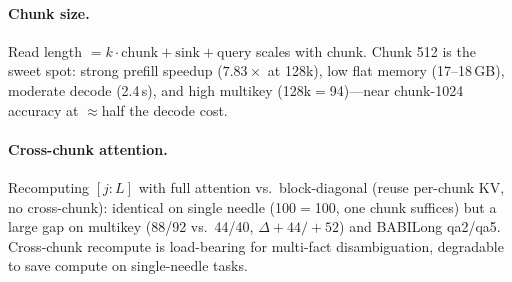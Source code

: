 \paragraph{Chunk size.} Read length $=k\cdot\text{chunk}+\text{sink}+\text{query}$
scales with chunk. Chunk 512 is the sweet spot: strong prefill speedup
($7.83\times$ at 128k), low flat memory (17--18\,GB), moderate decode (2.4\,s),
and high multikey (128k$=$94)---near chunk-1024 accuracy at $\approx$half the
decode cost.
\paragraph{Cross-chunk attention.} Recomputing $[j{:}L]$ with full attention
vs.\ block-diagonal (reuse per-chunk KV, no cross-chunk): identical on single
needle (100$=$100, one chunk suffices) but a large gap on multikey
(88/92 vs.\ 44/40, $\Delta{+}44/{+}52$) and BABILong qa2/qa5. Cross-chunk
recompute is load-bearing for multi-fact disambiguation, degradable to save
compute on single-needle tasks.
